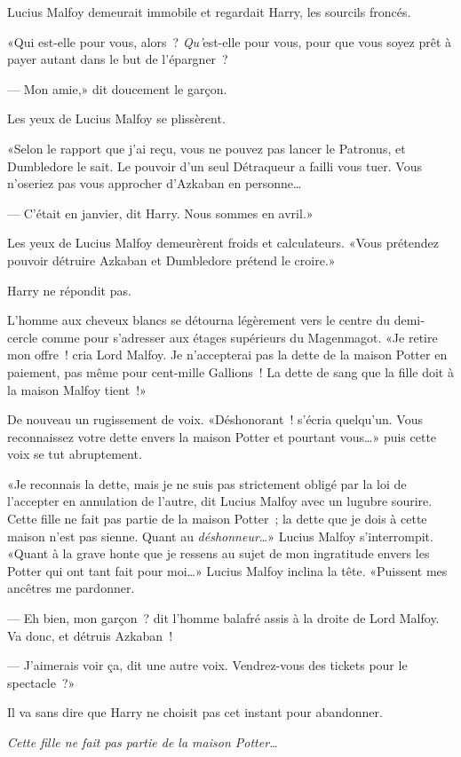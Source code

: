 Lucius Malfoy demeurait immobile et regardait Harry, les sourcils froncés.

«Qui est-elle pour vous, alors~? \emph{Qu'}est-elle pour vous, pour que vous soyez prêt à payer autant dans le but de l'épargner~?

--- Mon amie,» dit doucement le garçon.

Les yeux de Lucius Malfoy se plissèrent.

«Selon le rapport que j'ai reçu, vous ne pouvez pas lancer le Patronus, et Dumbledore le sait. Le pouvoir d'un seul Détraqueur a failli vous tuer. Vous n'oseriez pas vous approcher d'Azkaban en personne…

--- C'était en janvier, dit Harry. Nous sommes en avril.»

Les yeux de Lucius Malfoy demeurèrent froids et calculateurs. «Vous prétendez pouvoir détruire Azkaban et Dumbledore prétend le croire.»

Harry ne répondit pas.

L'homme aux cheveux blancs se détourna légèrement vers le centre du demi-cercle comme pour s'adresser aux étages supérieurs du Magenmagot. «Je retire mon offre~! cria Lord Malfoy. Je n'accepterai pas la dette de la maison Potter en paiement, pas même pour cent-mille Gallions~! La dette de sang que la fille doit à la maison Malfoy tient~!»

De nouveau un rugissement de voix. «Déshonorant~! s'écria quelqu'un. Vous reconnaissez votre dette envers la maison Potter et pourtant vous…» puis cette voix se tut abruptement.

«Je reconnais la dette, mais je ne suis pas strictement obligé par la loi de l'accepter en annulation de l'autre, dit Lucius Malfoy avec un lugubre sourire. Cette fille ne fait pas partie de la maison Potter~; la dette que je dois à cette maison n'est pas sienne. Quant au \emph{déshonneur}…» Lucius Malfoy s'interrompit. «Quant à la grave honte que je ressens au sujet de mon ingratitude envers les Potter qui ont tant fait pour moi…» Lucius Malfoy inclina la tête. «Puissent mes ancêtres me pardonner.

--- Eh bien, mon garçon~? dit l'homme balafré assis à la droite de Lord Malfoy. Va donc, et détruis Azkaban~!

--- J'aimerais voir ça, dit une autre voix. Vendrez-vous des tickets pour le spectacle~?»

Il va sans dire que Harry ne choisit pas cet instant pour abandonner.

\emph{Cette fille ne fait pas partie de la maison Potter…}

